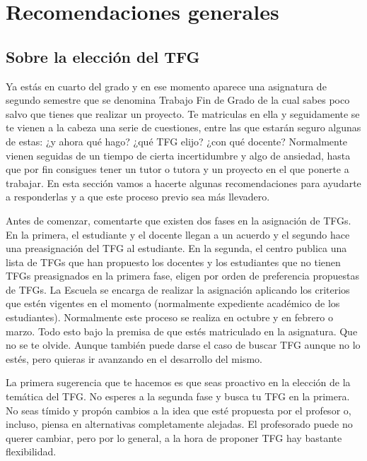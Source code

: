 \chapter{Recomendaciones generales}
\label{cap:Recomendaciones}


\section{Sobre la elección del TFG}


Ya estás en cuarto del grado y en ese momento aparece una asignatura de segundo semestre que se denomina Trabajo Fin de Grado de la cual sabes poco salvo que tienes que realizar un proyecto. Te matriculas en ella y seguidamente se te vienen a la cabeza una serie de cuestiones, entre las que estarán seguro algunas de estas: ¿y ahora qué hago? ¿qué TFG elijo? ¿con qué docente? Normalmente vienen seguidas de un tiempo de cierta incertidumbre y algo de ansiedad, hasta que por fin consigues tener un tutor o tutora y un proyecto en el que ponerte a trabajar. En esta sección vamos a hacerte algunas recomendaciones para ayudarte a responderlas y a que este proceso previo sea más llevadero.

Antes de comenzar, comentarte que existen dos fases en la asignación de TFGs. En la primera, el estudiante y el docente llegan a un acuerdo y el segundo hace una preasignación del TFG al estudiante. En la segunda, el centro publica una lista de TFGs que han propuesto los docentes y los estudiantes que no tienen TFGs preasignados en la primera fase, eligen por orden de preferencia propuestas de TFGs. La Escuela se encarga de realizar la asignación aplicando los criterios que estén vigentes en el momento (normalmente expediente académico de los estudiantes). Normalmente este proceso se realiza en octubre y en febrero o marzo. Todo esto bajo la premisa de que estés matriculado en la asignatura. Que no se te olvide. Aunque también puede darse el caso de buscar TFG aunque no lo estés, pero quieras ir avanzando en el desarrollo del mismo. 

La primera sugerencia que te hacemos es que seas proactivo en la elección de la temática del TFG. No esperes a la segunda fase y busca tu TFG en la primera. No seas tímido y propón cambios a la idea que esté propuesta por el profesor o, incluso, piensa en alternativas completamente alejadas. El profesorado puede no querer cambiar, pero por lo general, a la hora de proponer TFG hay bastante flexibilidad.

